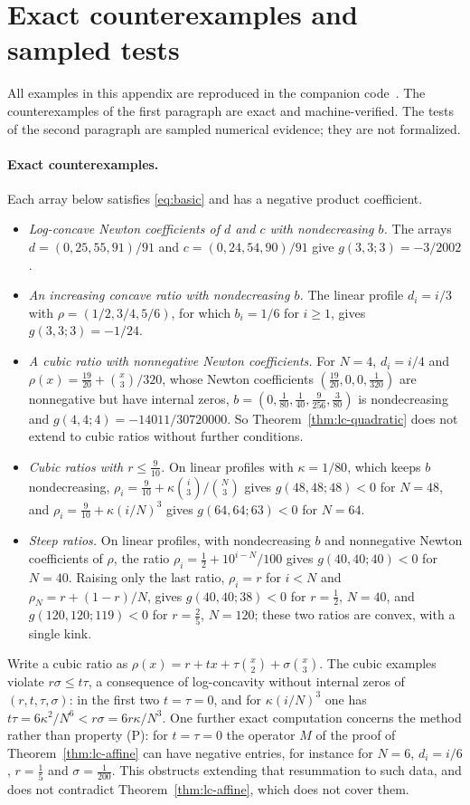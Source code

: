 \section{Exact counterexamples and sampled tests}\label{app:frontier}

All examples in this appendix are reproduced in the companion code~\cite{code}. The counterexamples of the first paragraph are exact and machine-verified. The tests of the second paragraph are sampled numerical evidence; they are not formalized.

\paragraph{Exact counterexamples.} Each array below satisfies \eqref{eq:basic} and has a negative product coefficient.
\begin{itemize}
\item \emph{Log-concave Newton coefficients of $d$ and $c$ with nondecreasing $b$.} The arrays $d=(0,25,55,91)/91$ and $c=(0,24,54,90)/91$ give $g(3,3;3)=-3/2002$.
\item \emph{An increasing concave ratio with nondecreasing $b$.} The linear profile $d_i=i/3$ with $\rho=(1/2,3/4,5/6)$, for which $b_i=1/6$ for $i\geq1$, gives $g(3,3;3)=-1/24$.
\item \emph{A cubic ratio with nonnegative Newton coefficients.} For $N=4$, $d_i=i/4$ and $\rho(x)=\frac{19}{20}+\binom x3/320$, whose Newton coefficients $(\frac{19}{20},0,0,\frac1{320})$ are nonnegative but have internal zeros, $b=(0,\frac1{80},\frac1{40},\frac9{256},\frac3{80})$ is nondecreasing and $g(4,4;4)=-14011/30720000$. So Theorem~\ref{thm:lc-quadratic} does not extend to cubic ratios without further conditions.
\item \emph{Cubic ratios with $r\leq\frac9{10}$.} On linear profiles with $\kappa=1/80$, which keeps $b$ nondecreasing, $\rho_i=\frac9{10}+\kappa\binom i3/\binom N3$ gives $g(48,48;48)<0$ for $N=48$, and $\rho_i=\frac9{10}+\kappa(i/N)^3$ gives $g(64,64;63)<0$ for $N=64$.
\item \emph{Steep ratios.} On linear profiles, with nondecreasing $b$ and nonnegative Newton coefficients of $\rho$, the ratio $\rho_i=\frac12+10^{i-N}/100$ gives $g(40,40;40)<0$ for $N=40$. Raising only the last ratio, $\rho_i=r$ for $i<N$ and $\rho_N=r+(1-r)/N$, gives $g(40,40;38)<0$ for $r=\frac12$, $N=40$, and $g(120,120;119)<0$ for $r=\frac25$, $N=120$; these two ratios are convex, with a single kink.
\end{itemize}
Write a cubic ratio as $\rho(x)=r+tx+\tau\binom x2+\sigma\binom x3$. The cubic examples violate $r\sigma\leq t\tau$, a consequence of log-concavity without internal zeros of $(r,t,\tau,\sigma)$: in the first two $t=\tau=0$, and for $\kappa(i/N)^3$ one has $t\tau=6\kappa^2/N^6<r\sigma=6r\kappa/N^3$. One further exact computation concerns the method rather than property (P): for $t=\tau=0$ the operator $M$ of the proof of Theorem~\ref{thm:lc-affine} can have negative entries, for instance for $N=6$, $d_i=i/6$, $r=\frac15$ and $\sigma=\frac1{200}$. This obstructs extending that resummation to such data, and does not contradict Theorem~\ref{thm:lc-affine}, which does not cover them.

